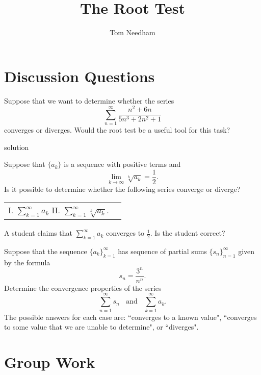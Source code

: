 \documentclass[handout]{ximera}
\author{Tom Needham}
\title[]{The Root Test}
\begin{document}
\begin{abstract}
\end{abstract}
\maketitle

\vspace{-0.5in}

\section{Discussion Questions}

\begin{problem}
Suppose that we want to determine whether the series
$$
\sum_{n=1}^\infty \frac{n^2+6n}{5n^3 + 2n^2 + 1}
$$
converges or diverges. Would the root test be a useful tool for this task?
\end{problem}

\begin{freeResponse}
solution
\end{freeResponse}

\begin{problem}
Suppose that $\{a_k\}$ is a sequence with positive terms and 
$$
\lim_{k \rightarrow \infty} \sqrt[k]{a_k} = \frac{1}{2}.
$$
Is it possible to determine whether the following series converge or diverge?
\begin{center}
\begin{tabular}{ll}
I. $\sum_{k=1}^\infty a_k$ \hspace{1in} II. $\sum_{k=1}^\infty \sqrt[k]{a_k}$.
\end{tabular}
\end{center}
A student claims that $\sum_{k=1}^\infty a_k$ converges to $\frac{1}{2}$. Is the student correct?
\end{problem}

\begin{problem}
Suppose that the sequence $\{a_k\}_{k=1}^\infty$ has sequence of partial sums $\{s_n\}_{n=1}^\infty$ given by the formula
$$
s_n = \frac{3^n}{n^n}.
$$
Determine the convergence properties of the series 
$$
\sum_{n=1}^\infty s_n \;\; \mbox{ and } \;\; \sum_{k=1}^\infty a_k. 
$$
The possible answers for each case are: ``converges to a known value", ``converges to some value that we are unable to determine", or ``diverges".
\end{problem}

\section{Group Work}
\end{document}

